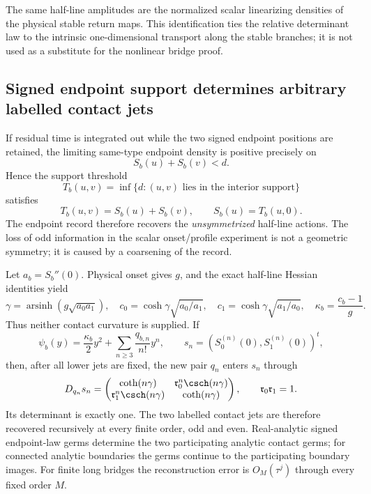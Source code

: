 The same half-line amplitudes are the normalized scalar linearizing densities
of the physical stable return maps.  This identification ties the relative
determinant law to the intrinsic one-dimensional transport along the stable
branches; it is not used as a substitute for the nonlinear bridge proof.

\subsection{Signed endpoint support determines arbitrary labelled contact jets}

If residual time is integrated out while the two signed endpoint positions
are retained, the limiting same-type endpoint density is positive precisely
on
\begin{equation}\label{eq:intro-support}
                   S_b(u)+S_b(v)<d.
\end{equation}
Hence the support threshold
\[
 T_b(u,v)=\inf\{d:(u,v)\text{ lies in the interior support}\}
\]
satisfies
\[
 T_b(u,v)=S_b(u)+S_b(v),\qquad S_b(u)=T_b(u,0).
\]
The endpoint record therefore recovers the \emph{unsymmetrized} half-line
actions.  The loss of odd information in the scalar onset/profile experiment
is not a geometric symmetry; it is caused by a coarsening of the record.

Let $a_b=S_b''(0)$.  Physical onset gives $g$, and the exact half-line Hessian
identities yield
\[
 \gamma=\operatorname{arsinh}(g\sqrt{a_0a_1}),
 \quad
 c_0=\cosh\gamma\sqrt{a_0/a_1},
 \quad
 c_1=\cosh\gamma\sqrt{a_1/a_0},
 \quad
 \kappa_b=\frac{c_b-1}{g}.
\]
Thus neither contact curvature is supplied.  If
\[
 \psi_b(y)=\frac{\kappa_b}{2}y^2+
 \sum_{n\ge3}\frac{q_{b,n}}{n!}y^n,
 \qquad
 s_n=(S_0^{(n)}(0),S_1^{(n)}(0))^t,
\]
then, after all lower jets are fixed, the new pair $q_n$ enters $s_n$ through
\begin{equation}\label{eq:intro-jet-block}
 D_{q_n}s_n=
 \begin{pmatrix}
 \coth(n\gamma)&\mathfrak r_0^n\csch(n\gamma)\\
 \mathfrak r_1^n\csch(n\gamma)&\coth(n\gamma)
 \end{pmatrix},
 \qquad \mathfrak r_0\mathfrak r_1=1.
\end{equation}
Its determinant is exactly one.  The two labelled contact jets are therefore
recovered recursively at every finite order, odd and even.  Real-analytic
signed endpoint-law germs determine the two participating analytic contact
germs; for connected analytic boundaries the germs continue to the
participating boundary images.  For finite long bridges the reconstruction
error is $O_M(\tau^j)$ through every fixed order $M$.

